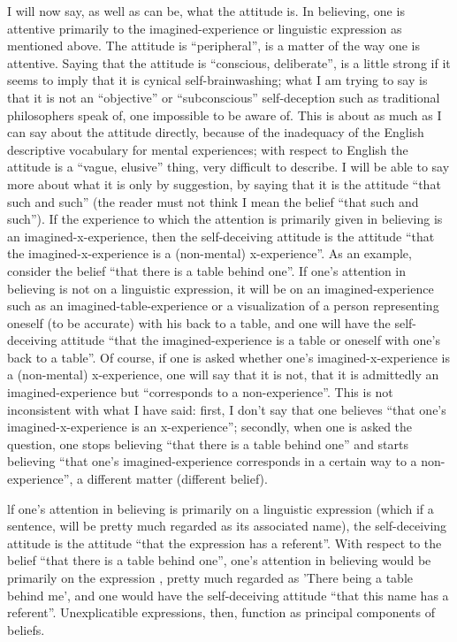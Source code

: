 I will now say, as well as can be, what the attitude is. In believing, one 
is attentive primarily to the imagined-experience or linguistic expression as 
mentioned above. The attitude is \enquote{peripheral}, is a matter of the way one is 
attentive. Saying that the attitude is \enquote{conscious, deliberate}, is a little 
strong if it seems to imply that it is cynical self-brainwashing; what I am 
trying to say is that it is not an \enquote{objective} or \enquote{subconscious} self-deception 
such as traditional philosophers speak of, one impossible to be aware of. This 
is about as much as I can say about the attitude directly, because of the 
inadequacy of the English descriptive vocabulary for mental experiences; 
with respect to English the attitude is a \enquote{vague, elusive} thing, very difficult 
to describe. I will be able to say more about what it is only by suggestion, by 
saying that it is the attitude \enquote{that such and such} (the reader must not think 
I mean the belief \enquote{that such and such}). If the experience to which the 
attention is primarily given in believing is an imagined-x-experience, then the 
self-deceiving attitude is the attitude \enquote{that the imagined-x-experience is a 
(non-mental) x-experience}. As an example, consider the belief \enquote{that there is 
a table behind one}. If one's attention in believing is not on a linguistic 
expression, it will be on an imagined-experience such as an 
imagined-table-experience or a visualization of a person representing oneself 
(to be accurate) with his back to a table, and one will have the self-deceiving 
attitude \enquote{that the imagined-experience is a table or oneself with one's back 
to a table}. Of course, if one is asked whether one's imagined-x-experience is 
a (non-mental) x-experience, one will say that it is not, that it is admittedly 
an imagined-experience but \enquote{corresponds to a non-experience}. This is not 
inconsistent with what I have said: first, I don't say that one believes \enquote{that 
one's imagined-x-experience is an x-experience}; secondly, when one is asked 
the question, one stops believing \enquote{that there is a table behind one} and starts 
believing \enquote{that one's imagined-experience corresponds in a certain way to a 
non-experience}, a different matter (different belief). 

lf one's attention in believing is primarily on a linguistic expression 
(which if a sentence, will be pretty much regarded as its associated name), 
the self-deceiving attitude is the attitude \enquote{that the expression has a 
referent}. With respect to the belief \enquote{that there is a table behind one}, one's 
attention in believing would be primarily on the expression , pretty much regarded as 'There being a table behind me', and 
one would have the self-deceiving attitude \enquote{that this name has a referent}. 
Unexplicatible expressions, then, function as principal components of 
beliefs. 

